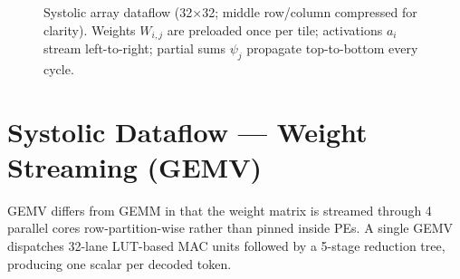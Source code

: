 \documentclass[11pt,a4paper,twoside,openany]{report}
\begin{document}
\begin{figure}[h]
\caption{Systolic array dataflow (32$\times$32; middle row/column
compressed for clarity). Weights $W_{i,j}$ are preloaded once per tile;
activations $a_i$ stream left-to-right; partial sums $\psi_j$ propagate
top-to-bottom every cycle.}
\label{fig:systolic}
\end{figure}

\section{Systolic Dataflow — Weight Streaming (GEMV)}

GEMV differs from GEMM in that the weight matrix is streamed through
4 parallel cores row-partition-wise rather than pinned inside PEs. A
single GEMV dispatches 32-lane LUT-based MAC units followed by a
5-stage reduction tree, producing one scalar per decoded token.
\end{document}
